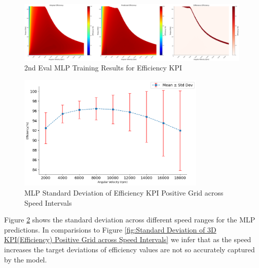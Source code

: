 \documentclass{report} %
\begin{document}
\begin{figure}[H]
    \centering
    \includegraphics[width=1\textwidth]{./ReportImages/evalKPI3Dprediction2.png} 
    \caption{2nd Eval MLP Training Results for Efficiency \ac{KPI}} 
    \label{fig:2nd Eval MLP Training for 3D KPI(Efficiency)}
\end{figure}

\begin{figure}[H]
    \centering
    \includegraphics[width=0.8\textwidth]{./ReportImages/stddev_y2_nn_MLP.png} 
    \caption{\ac{MLP} Standard Deviation of Efficiency \ac{KPI} Positive Grid across Speed Intervals} 
    \label{fig:MLP Standard Deviation of 3D KPI(Efficiency) Positive Grid across Speed Intervals}
\end{figure}

Figure \ref{fig:MLP Standard Deviation of 3D KPI(Efficiency) Positive Grid across Speed Intervals} shows the standard deviation across different speed ranges for the \ac{MLP} predictions.
In comparisions to Figure \ref{fig:Standard Deviation of 3D KPI(Efficiency) Positive Grid across Speed Intervals} we infer that as the speed increases the target deviations of efficiency values are not so accurately captured by the model.
\end{document}
